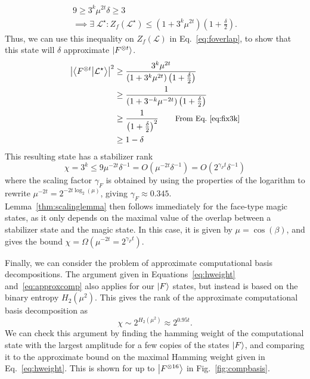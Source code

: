 \documentclass{standalone}
\begin{document}
\begin{align}
\label{eq:fix3k}
9\geq 3^{k}\mu^{2t}\delta\geq 3\\
\label{eq:Zfbound}
\implies\exists\;\mathcal{L}^{\star} : Z_{f}\left(\mathcal{L}^{\star}\right)\leq \left(1+3^{k}\mu^{2t}\right)\left(1+\frac{\delta}{2}\right).
\end{align}
Thus, we can use this inequality on $Z_{f}(\mathcal{L})$ in Eq.~\ref{eq:foverlap}, to show that this state will $\delta$ approximate $\ket{F^{\otimes t}}$.
\begin{align}
\begin{split}
    \left| \braket{F^{\otimes t}}{\mathcal{L}^{\star}}\right|^{2} &\geq
    \frac{3^{k}\mu^{2t}}{\left(1+3^{k}\mu^{2t}\right)\left(1+\frac{\delta}{2}\right)}  \\
    &\geq \frac{1}{\left(1+3^{-k}\mu^{-2t}\right)\left(1+\frac{\delta}{2}\right)}\\
    &\geq \frac{1}{\left(1+\frac{\delta}{2}\right)^{2}} \qquad \text{\small{From Eq.~\ref{eq:fix3k}}}\\
    &\geq 1-\delta \\
\end{split}
\end{align}
This resulting state has a stabilizer rank 
\begin{equation}
\chi=3^{k}\leq 9\mu^{-2t}\delta^{-1} = O\left(\mu^{-2t}\delta^{-1}\right)=O\left(2^{\gamma_{F}t}\delta^{-1}\right)
\end{equation}
where the scaling factor $\gamma_{F}$ is obtained by using the properties of the logarithm to rewrite $\mu^{-2t}=2^{-2t\log_{2}(\mu)}$, giving $\gamma_{F}\approx0.345$.\\
Lemma~\ref{thm:scalinglemma} then follows immediately for the face-type magic states, as it only depends on the maximal value of the overlap between a stabilizer state and the magic state. In this case, it is given by $\mu=\cos(\beta)$, and gives the bound $\chi=\Omega\left(\mu^{-2t}=2^{\gamma_{F}t}\right)$.
\par
Finally, we can consider the problem of approximate computational basis decompositions. The argument given in Equations~\ref{eq:hweight} and~\ref{eq:approxcomp} also applies for our $\ket{F}$ states, but instead is based on the binary entropy $H_{2}(\mu^{2})$. This gives the rank of the approximate computational basis decomposition as
\begin{equation}
    \chi\sim 2^{H_{2}(\mu^{2})}\approx 2^{0.95t}.
\end{equation}
We can check this argument by finding the hamming weight of the computational state with the largest amplitude for a few copies of the states $\ket{F}$, and comparing it to the approximate bound on the maximal Hamming weight given in Eq.~\ref{eq:hweight}. This is shown for up to $\ket{F^{\otimes 16}}$ in Fig.~\ref{fig:compbasis}.
\end{document}
